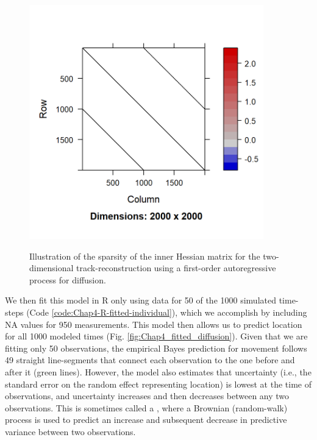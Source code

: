 \begin{figure}[!ht]
    \caption[Sparsity pattern for 2D autoregressive state-space model]{Illustration of the sparsity of the inner Hessian matrix for the two-dimensional track-reconstruction using a first-order autoregressive process for diffusion.}
    \centering
    \includegraphics[width=4in]{Chap_4/sparsity.png}
    \label{fig:Chap4_hessian}
\end{figure}

We then fit this model in R only using data for 50 of the 1000 simulated time-steps (Code \ref{code:Chap4-R-fitted-individual}), which we accomplish by including \colorbox{backcolour}{NA} values for 950 measurements.  This model then allows us to predict location for all 1000 modeled times (Fig. \ref{fig:Chap4_fitted_diffusion}).  Given that we are fitting only 50 observations, the empirical Bayes prediction for movement follows 49 straight line-segments that connect each observation to the one before and after it (green lines). However, the model also estimates that uncertainty (i.e., the standard error on the random effect representing location) is lowest at the time of observations, and uncertainty increases and then decreases between any two observations.  This is sometimes called a , where a Brownian (random-walk) process is used to predict an increase and subsequent decrease in predictive variance between two observations.

\lstset{style=Rcode}


